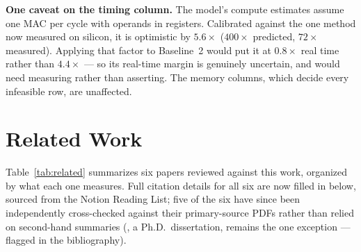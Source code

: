 \documentclass[11pt]{article}
\begin{document}
\textbf{One caveat on the timing column.} The model's compute estimates
assume one MAC per cycle with operands in registers. Calibrated against the
one method now measured on silicon, it is optimistic by $5.6\times$
($400\times$ predicted, $72\times$ measured). Applying that factor to
Baseline~2 would put it at $0.8\times$ real time rather than $4.4\times$ ---
so its real-time margin is genuinely uncertain, and would need measuring
rather than asserting. The memory columns, which decide every infeasible row,
are unaffected.

\section{Related Work}
\label{sec:related}

Table~\ref{tab:related} summarizes six papers reviewed against this work,
organized by what each one measures. Full citation details for all six are
now filled in below, sourced from the Notion Reading List; five of the six
have since been independently cross-checked against their primary-source
PDFs rather than relied on second-hand summaries (\cite{aidriven}, a
Ph.D.\ dissertation, remains the one exception --- flagged in the
bibliography).
\end{document}
